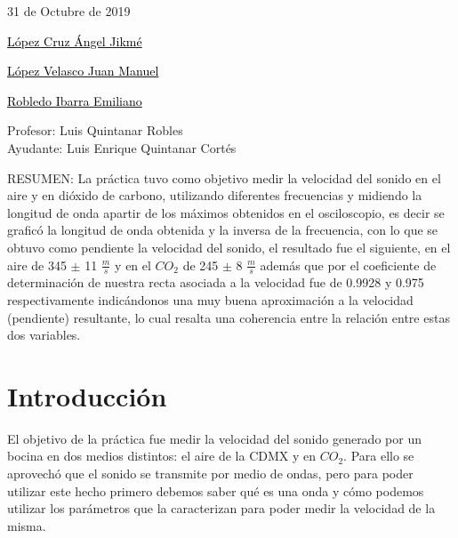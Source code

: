 \documentclass[10pt,a4paper]{article}
\begin{document}
\vspace{.7 cm}
\begin{flushleft}{\Large 31 de Octubre de 2019  }\\[0.6cm]
\end{flushleft}
\begin{flushright}{\Large{\underline{\textcolor{black}{López Cruz Ángel Jikmé}}}}\\[0.78cm]
\end{flushright}
\begin{flushright}{\Large{\underline{\textcolor{black}{López Velasco Juan Manuel}}}}\\[0.78cm]

\begin{flushright}{\Large{\underline{\textcolor{black}{Robledo Ibarra Emiliano}}}}\\[0.9cm]

\end{flushright}\end{flushright}
\begin{center}
{\Large Profesor: Luis Quintanar Robles }\\[0.8cm]
{\Large Ayudante: Luis Enrique Quintanar Cortés }\\[0.8cm]
\end{center}
RESUMEN:
La práctica tuvo como objetivo medir la velocidad del sonido en el aire y en dióxido de carbono, utilizando diferentes frecuencias y midiendo la longitud de onda apartir de los máximos obtenidos en el osciloscopio, es decir se graficó la longitud de onda obtenida y la inversa de la frecuencia, con lo que se obtuvo como pendiente la velocidad del sonido, el resultado fue el siguiente, en el aire de 345 $\pm$ 11 $\frac{m}{s}$ y en el $CO_2$ de 245 $\pm$ 8 $\frac{m}{s}$ además que por el coeficiente de determinación de nuestra recta asociada a la velocidad fue de 0.9928 y 0.975 respectivamente indicándonos una muy buena aproximación a la velocidad (pendiente) resultante, lo cual resalta una coherencia entre la relación entre estas dos variables.
\normalsize
\newpage


\section{Introducción}
El objetivo de la práctica fue medir la velocidad del sonido generado por un bocina en dos medios distintos: el aire de la CDMX y en $CO_2$. Para ello se aprovechó que el sonido se transmite por medio de ondas, pero para poder utilizar este hecho primero debemos saber qué es una onda y cómo podemos utilizar los parámetros que la caracterizan para poder medir la velocidad de la misma.
\end{document}
